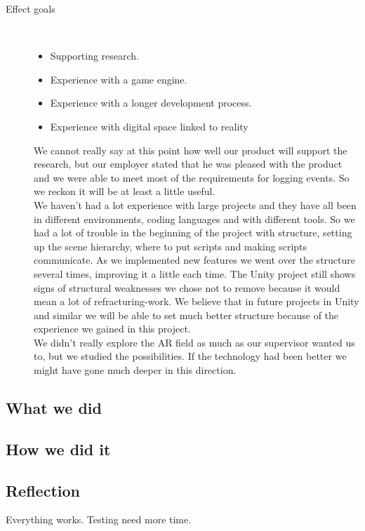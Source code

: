 \begin{description}
	\item[Effect goals]\ 
	\begin{itemize}
		\item Supporting research.
		\item Experience with a game engine.
		\item Experience with a longer development process.
		\item Experience with digital space linked to reality
	\end{itemize}
	We cannot really say at this point how well our product will support the research, but our employer stated that he was pleased with the product and we were able to meet most of the requirements for logging events. So we reckon it will be at least a little useful.\\
	We haven't had a lot experience with large projects and they have all been in different environments, coding languages and with different tools. So we had a lot of trouble in the beginning of the project with structure, setting up the scene hierarchy, where to put scripts and making scripts communicate. As we implemented new features we went over the structure several times, improving it a little each time. The Unity project still shows signs of structural weaknesses we chose not to remove because it would mean a lot of refracturing-work. We believe that in future projects in Unity and similar we will be able to set much better structure because of the experience we gained in this project.\\
	We didn't really explore the AR field as much as our supervisor wanted us to, but we studied the possibilities. If the technology had been better we might have gone much deeper in this direction.


\end{description}


\subsection{What we did}

\subsection{How we did it}

\subsection{Reflection}
Everything works.
Testing need more time.